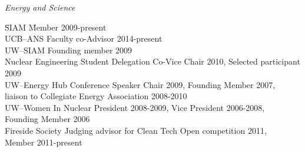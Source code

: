 \textit{Energy and Science}
\begin{tabbing}
\hspace*{2 em}\= SIAM  \hspace*{15em} \= Member 2009-present\\
%
\> UCB--ANS \> Faculty co-Advisor 2014-present  \\
%
%
\> UW--SIAM \> Founding member 2009\\
%
\> Nuclear Engineering Student Delegation \> Co-Vice Chair 2010, Selected participant 2009\\
%
\> UW--Energy Hub \> Conference Speaker Chair 2009, Founding Member 2007,  \\ \> \> liaison to Collegiate Energy Association 2008-2010\\
%
\> UW--Women In Nuclear \> President 2008-2009, Vice President 2006-2008,  \\ \> \> Founding Member 2006\\
%
%
\> Fireside Society \> Judging advisor for Clean Tech Open competition 2011,  \\ \> \>Member 2011-present
\end{tabbing}

